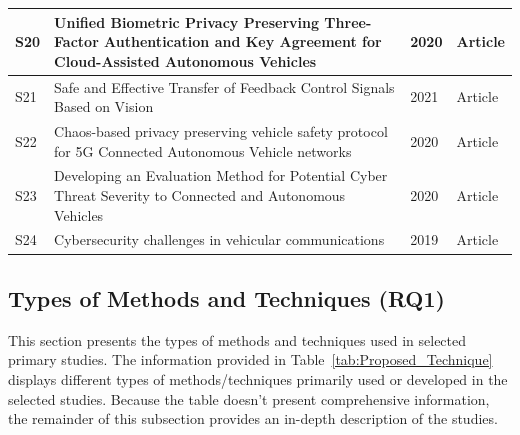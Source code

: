 \documentclass[a4paper,12pt]{article}
\begin{document}
\begin{table}[hbt!]
{\begin{tabular}{|l|l|l|l|}
S20                                                                              & Unified Biometric Privacy Preserving Three-Factor Authentication and Key Agreement for Cloud-Assisted Autonomous Vehicles & 2020                                                                              & Article                                                                           \\ \hline
S21                                                                              & Safe and Effective Transfer of Feedback Control Signals Based on Vision                                                & 2021                                                                              & Article                                                                           \\ \hline
S22                                                                              & Chaos-based privacy preserving vehicle safety protocol for 5G Connected Autonomous Vehicle networks                       & 2020                                                                              & Article                                                                           \\ \hline
S23                                                                              & Developing an Evaluation Method for Potential Cyber Threat Severity to Connected and Autonomous Vehicles                     & 2020                                                                              & Article                                                                           \\ \hline
S24                                                                              & Cybersecurity challenges in vehicular communications                                                                      & 2019                                                                              & Article                                                                           \\ \hline
\end{tabular}%
}
\end{table}




\newpage
\subsection{Types of Methods and Techniques (RQ1) }
\hspace{5mm} This section presents the types of methods and techniques used in selected primary studies. The information provided in Table~\ref{tab:Proposed_Technique} displays different types of methods/techniques primarily used or developed in the selected studies. Because the table doesn't present comprehensive information, the remainder of this subsection provides an in-depth description of the studies.
\end{document}
